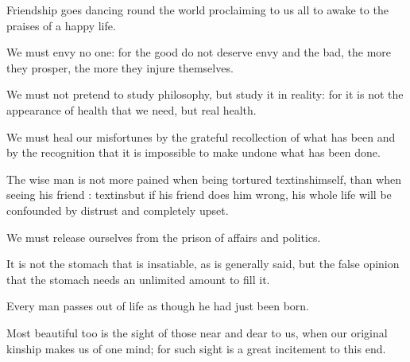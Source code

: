 \documentclass{stex}
\begin{document}
\vspace{0.5em}
\begin{sparagraph}[title=52]
  Friendship goes dancing round the world proclaiming to us all to awake to the praises of a happy life.
\end{sparagraph}
\vspace{0.5em}
\begin{sparagraph}[title=53]
  We must envy no one: for the good do not deserve envy and the bad, the more they prosper, the more they injure themselves.
\end{sparagraph}
\vspace{0.5em}
\begin{sparagraph}[title=54]
  We must not pretend to study philosophy, but study it in reality: for it is not the appearance of health that we need, but real health.
\end{sparagraph}
\vspace{0.5em}
\begin{sparagraph}[title=55]
  We must heal our misfortunes by the grateful recollection of what has been and by the recognition that it is impossible to make undone what has been done.
\end{sparagraph}
\vspace{0.5em}
\begin{sparagraph}[title=56--57]
  The wise man is not more pained when being tortured textins{himself, than when seeing} his friend : textins{but if his friend does him wrong}, his whole life will be confounded by distrust and completely upset.
\end{sparagraph}
\vspace{0.5em}
\begin{sparagraph}[title=58]
  We must release ourselves from the prison of affairs and politics.
\end{sparagraph}
\vspace{0.5em}
\begin{sparagraph}[title=59]
  It is not the stomach that is insatiable, as is generally said, but the false opinion that the stomach needs an unlimited amount to fill it.
\end{sparagraph}
\vspace{0.5em}
\begin{sparagraph}[title=60]
  Every man passes out of life as though he had just been born.
\end{sparagraph}
\vspace{0.5em}
\begin{sparagraph}[title=61]
  Most beautiful too is the sight of those near and dear to us, when our original kinship makes us of one mind; for such sight is a great incitement to this end.
\end{sparagraph}
\end{document}
